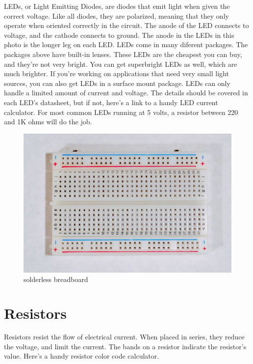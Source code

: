LEDs, or Light Emitting Diodes, are diodes that emit light when given the correct voltage. Like all diodes, they are polarized, meaning that they only operate when oriented correctly in the circuit. The anode of the LED connects to voltage, and the cathode connects to ground. The anode in the LEDs in this photo is the longer leg on each LED. LEDs come in many diferent packages. The packages above have built-in lenses.
These LEDs are the cheapest you can buy, and they're not very bright. You can get superbright LEDs as well, which are much brighter. If you're working on applications that need very small light sources, you can also get LEDs in a surface mount package.
LEDs can only handle a limited amount of current and voltage. The details should be covered in each LED's datasheet, but if not, here's a link to a handy LED current calculator. For most common LEDs running at 5 volts, a resistor between 220 and 1K ohms will do the job.

\begin{figure}[!htb]
     \centering
     \includegraphics[scale=0.55]{img/components/breadboard_short.jpg}
     \caption{solderless breadboard}
     \label{solderless breadboard}
\end{figure}



\section{Resistors}

Resistors resist the flow of electrical current. When placed in series, they reduce the voltage, and limit the current. The bands on a resistor indicate the resistor's value. Here's a handy resistor color code calculator. 

